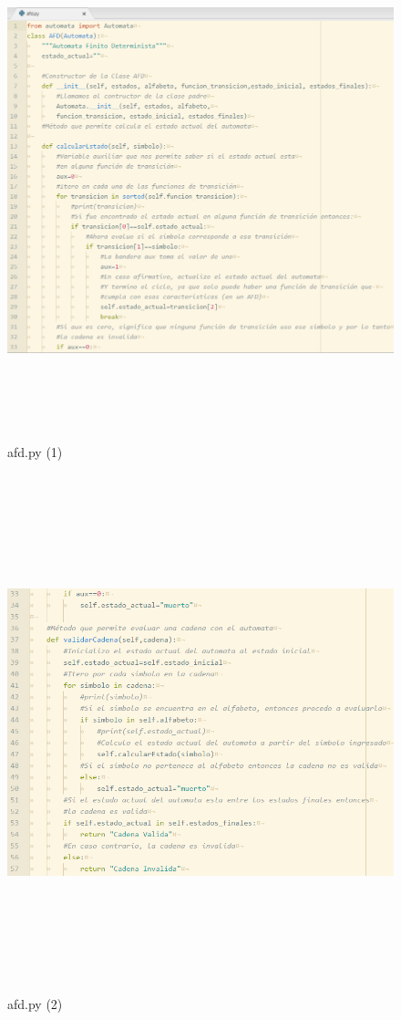	\begin{figure}[H]
		\begin{center}
			\includegraphics[width=15cm, height=15cm]{img/afd_1.png}
			\caption{afd.py (1)}
			\label{fig:tablas2}
		\end{center}
	\end{figure}
	\begin{figure}[H]
		\begin{center}
			\includegraphics[width=15cm, height=15cm]{img/afd_2.png}
			\caption{afd.py (2)}
			\label{fig:tablas3}
		\end{center}
	\end{figure}

